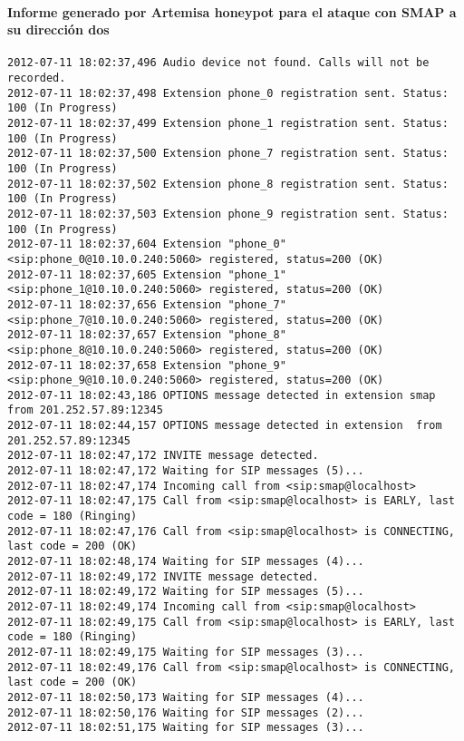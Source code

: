 \documentclass[a4paper,12pt]{report}
\newenvironment{mytinylisting}
{\begin{list}{}{\setlength{\leftmargin}{1em}}\item\tiny\bfseries}
{\end{list}}
\begin{document}
\paragraph{\label{Anexo_Artemisa_full_output} Informe generado por Artemisa honeypot para el ataque con SMAP a su dirección
\ac{dos}}
\begin{mytinylisting}
 \begin{verbatim}
2012-07-11 18:02:37,496 Audio device not found. Calls will not be recorded.
2012-07-11 18:02:37,498 Extension phone_0 registration sent. Status: 100 (In Progress)
2012-07-11 18:02:37,499 Extension phone_1 registration sent. Status: 100 (In Progress)
2012-07-11 18:02:37,500 Extension phone_7 registration sent. Status: 100 (In Progress)
2012-07-11 18:02:37,502 Extension phone_8 registration sent. Status: 100 (In Progress)
2012-07-11 18:02:37,503 Extension phone_9 registration sent. Status: 100 (In Progress)
2012-07-11 18:02:37,604 Extension "phone_0" <sip:phone_0@10.10.0.240:5060> registered, status=200 (OK)
2012-07-11 18:02:37,605 Extension "phone_1" <sip:phone_1@10.10.0.240:5060> registered, status=200 (OK)
2012-07-11 18:02:37,656 Extension "phone_7" <sip:phone_7@10.10.0.240:5060> registered, status=200 (OK)
2012-07-11 18:02:37,657 Extension "phone_8" <sip:phone_8@10.10.0.240:5060> registered, status=200 (OK)
2012-07-11 18:02:37,658 Extension "phone_9" <sip:phone_9@10.10.0.240:5060> registered, status=200 (OK)
2012-07-11 18:02:43,186 OPTIONS message detected in extension smap from 201.252.57.89:12345
2012-07-11 18:02:44,157 OPTIONS message detected in extension  from 201.252.57.89:12345
2012-07-11 18:02:47,172 INVITE message detected.
2012-07-11 18:02:47,172 Waiting for SIP messages (5)...
2012-07-11 18:02:47,174 Incoming call from <sip:smap@localhost>
2012-07-11 18:02:47,175 Call from <sip:smap@localhost> is EARLY, last code = 180 (Ringing)
2012-07-11 18:02:47,176 Call from <sip:smap@localhost> is CONNECTING, last code = 200 (OK)
2012-07-11 18:02:48,174 Waiting for SIP messages (4)...
2012-07-11 18:02:49,172 INVITE message detected.
2012-07-11 18:02:49,172 Waiting for SIP messages (5)...
2012-07-11 18:02:49,174 Incoming call from <sip:smap@localhost>
2012-07-11 18:02:49,175 Call from <sip:smap@localhost> is EARLY, last code = 180 (Ringing)
2012-07-11 18:02:49,175 Waiting for SIP messages (3)...
2012-07-11 18:02:49,176 Call from <sip:smap@localhost> is CONNECTING, last code = 200 (OK)
2012-07-11 18:02:50,173 Waiting for SIP messages (4)...
2012-07-11 18:02:50,176 Waiting for SIP messages (2)...
2012-07-11 18:02:51,175 Waiting for SIP messages (3)...

\end{verbatim}
\end{mytinylisting}
\end{document}
